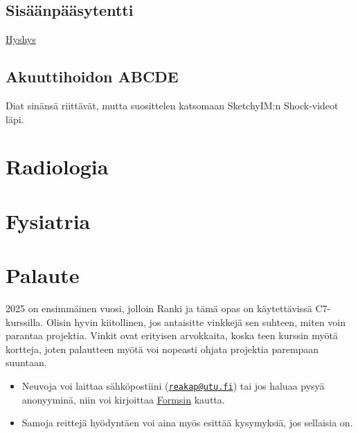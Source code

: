 \documentclass[
]{book}
\begin{document}
\section{Sisäänpääsytentti}\label{Sisaanpaasytentti}

\href{images/Sisäänpääsytentti_ANE.pdf}{Hyshys}

\section{Akuuttihoidon ABCDE}\label{akuuttihoidon-abcde}

Diat sinänsä riittävät, mutta suosittelen katsomaan SketchyIM:n Shock-videot läpi.

\chapter{Radiologia}\label{radiologia}

\chapter{Fysiatria}\label{fysiatria}

\chapter{Palaute}\label{palaute}

2025 on ensimmäinen vuosi, jolloin Ranki ja tämä opas on käytettävissä C7-kurssilla. Olisin hyvin kiitollinen, jos antaisitte vinkkejä sen suhteen, miten voin parantaa projektia. Vinkit ovat erityisen arvokkaita, koska teen kurssin myötä kortteja, joten palautteen myötä voi nopeasti ohjata projektia parempaan suuntaan.

\begin{itemize}
\item
  Neuvoja voi laittaa sähköpostiini (\href{mailto:reakap@utu.fi}{\nolinkurl{reakap@utu.fi}}) tai jos haluaa pysyä anonyyminä, niin voi kirjoittaa \href{https://docs.google.com/forms/d/e/1FAIpQLSericnXGU2U_h7stCFVZ5X0-6Q9BLGdiDugun_Mex3kf_bTpg/viewform?usp=sharing&ouid=112689903880978617225}{Formsin} kautta.
\item
  Samoja reittejä hyödyntäen voi aina myös esittää kysymyksiä, jos sellaisia on.
\end{itemize}


\end{document}
